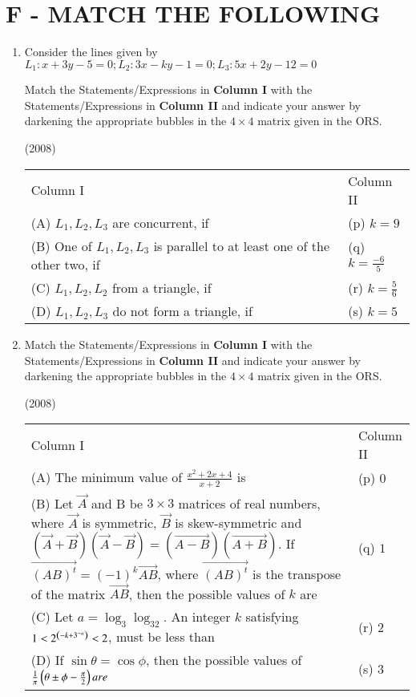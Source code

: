 \documentclass[journal,12pt,twocolumn]{IEEEtran}
\theoremstyle{remark}
\begin{document}
\onecolumn

\section*{F - MATCH THE FOLLOWING}
\bigskip
\begin{enumerate}
	\item Consider the lines given by
		$L_1:x+3y-5=0; L_2:3x-ky-1=0; L_3:5x+2y-12=0$

		Match the Statements/Expressions in \textbf{Column I} with the Statements/Expressions in \textbf{Column II} and indicate your answer by darkening the appropriate bubbles in the $4\times4$ matrix given in the ORS.

		\hfill(2008)

		\begin{tabular}{p{12cm} p{3cm}}
			Column I & Column II \\
			(A) $L_1,L_2,L_3$ are concurrent, if & (p) $k=9$ \\
			(B) One of $L_1,L_2,L_3$ is parallel to at least one of the other two, if & (q) $k=\frac{-6}{5}$ \\
			(C) $L_1,L_2,L_2$ from a triangle, if & (r) $k=\frac{5}{6}$ \\
			(D) $L_1,L_2,L_3$ do not form a triangle, if & (s) $k=5$
		\end{tabular}


	\item  Match the Statements/Expressions in \textbf{Column I} with the Statements/Expressions in \textbf{Column II} and indicate your answer by darkening the appropriate bubbles in the $4\times4$ matrix given in the ORS.

		\hfill(2008)

		\begin{tabular}{p{12cm} p{3cm}}
			Column I & Column II \\
			(A) The minimum value of $\frac{x^2+2x+4}{x+2}$ is & (p) $0$ \\
			(B) Let $\vec{A}$ and B be $3\times3$ matrices of real numbers, where $\vec{A}$ is symmetric, $\vec{B}$ is skew-symmetric and $(\vec{A}+\vec{B})(\vec{A}-\vec{B})=(\vec{A-B})(\vec{A+B})$. If $\vec{(AB)^t}=(-1)^k\vec{AB}$, where $\vec{(AB)^t}$ is the transpose of the matrix $\vec{AB}$, then the possible values of $k$ are & (q) $1$ \\
			(C) Let $a=\log_3\log_32$. An integer $k$ satisfying $1<2^{\left(-k+3^{-a}\right)}<2$, must be less than & (r) $2$ \\
			(D) If $\sin\theta=\cos\phi$, then the possible values of $\frac{1}{\pi}\left(\theta\pm\phi-\frac{\pi}{2}\right) are $ & (s) $3$
		\end{tabular}
\end{enumerate}
\end{document}
